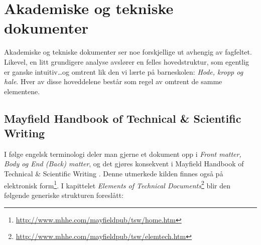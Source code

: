\section{Akademiske og tekniske dokumenter}

Akademiske og tekniske dokumenter ser noe forskjellige ut avhengig av fagfeltet. Likevel, en litt grundigere analyse avslører en felles hovedstruktur, som egentlig er ganske intuitiv\dots og omtrent lik den vi lærte på barneskolen: {\em Hode, kropp og hale}. Hver av disse hoveddelene består som regel av omtrent de samme elementene. 



\subsection{Mayfield Handbook of Technical \& Scientific Writing}
\label{sec:mayfield}

I følge engelsk terminologi deler man gjerne et dokument opp i {\em Front matter, Body og End (Back) matter}, og det gjøres konsekvent i
Mayfield Handbook of Technical \& Scientific Writing \cite{perelman97mht}. Denne utmerkede kilden finnes også på 
elektronisk form\footnote{\url{http://www.mhhe.com/mayfieldpub/tsw/home.htm}}. 
I kapittelet 
{\em Elements of Technical Documents}\footnote{\url{http://www.mhhe.com/mayfieldpub/tsw/elemtech.htm}}
blir den følgende generiske strukturen foreslått:

